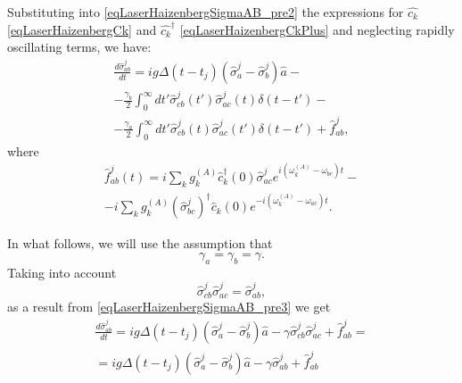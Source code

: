 Substituting into \eqref{eqLaserHaizenbergSigmaAB_pre2} the expressions for
$\hat{c_k}$ \eqref{eqLaserHaizenbergCk} and $\hat{c_k}^{\dag}$
\eqref{eqLaserHaizenbergCkPlus} and neglecting rapidly oscillating terms, we have:
\begin{eqnarray}
\frac{d \hat{\sigma}_{ab}^j}{d t} = 
i g 
\Delta\left(t - t_j\right) 
\left(\hat{\sigma}^{j}_{a} -
\hat{\sigma}^{j}_{b}\right)\hat{a} -
\nonumber \\
- \frac{\gamma_{b}}{2}
\int_0^{\infty}dt'
\hat{\sigma}^{j}_{cb}\left(t'\right)  
\hat{\sigma}^{j}_{ac}\left(t\right) 
\delta\left(t - t'\right) -
\nonumber \\ 
- \frac{\gamma_{a}}{2}
\int_0^{\infty}dt'
\hat{\sigma}^{j}_{cb}\left(t\right)  
\hat{\sigma}^{j}_{ac}\left(t'\right) 
\delta\left(t - t'\right) + \hat{f}_{ab}^{j},
\label{eqLaserHaizenbergSigmaAB_pre3}
\end{eqnarray}
where
\begin{eqnarray}
\hat{f}_{ab}^{j}\left(t\right) = 
i
\sum_{k}
g_k^{(A)}
\hat{c}_k^{\dag}\left(0\right)
\hat{\sigma}^{j}_{ac}  
e^{i\left(\omega_k^{(A)} - \omega_{bc}\right)t} -
\nonumber \\
-
 i
\sum_{k}
g_k^{(A)}
\left(\hat{\sigma}^{j}_{bc}\right)^{\dag}\hat{c}_k\left(0\right)
e^{-i\left(\omega_k^{(A)} - \omega_{ac}\right)t}.
\label{eqLaserHaizenbergFABJ}
\end{eqnarray}

In what follows, we will use the assumption that
\begin{equation}
\gamma_{a} =
\gamma_{b} = \gamma.
\label{eqLaserHaizenbergGamma}
\end{equation}
Taking into account
\[
\hat{\sigma}^{j}_{cb}\hat{\sigma}^{j}_{ac} = 
\hat{\sigma}^{j}_{ab},
\]
as a result from \eqref{eqLaserHaizenbergSigmaAB_pre3} we get 
\begin{eqnarray}
\frac{d \hat{\sigma}_{ab}^j}{d t} = 
i g 
\Delta\left(t - t_j\right) 
\left(\hat{\sigma}^{j}_{a} -
\hat{\sigma}^{j}_{b}\right)\hat{a} 
- \gamma \hat{\sigma}^{j}_{cb}\hat{\sigma}^{j}_{ac} 
 + \hat{f}_{ab}^{j} = 
\nonumber \\
= 
i g 
\Delta\left(t - t_j\right) 
\left(\hat{\sigma}^{j}_{a} -
\hat{\sigma}^{j}_{b}\right)\hat{a} 
- \gamma \hat{\sigma}^{j}_{ab} 
 + \hat{f}_{ab}^{j}
\label{eqLaserHaizenbergSigmaABJ}
\end{eqnarray}

